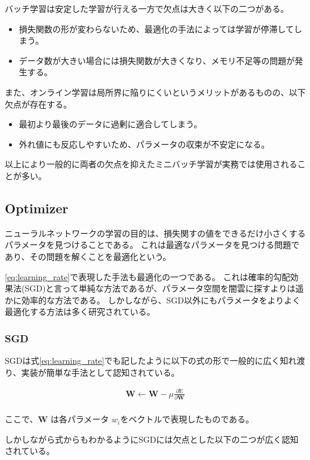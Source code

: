 バッチ学習は安定した学習が行える一方で欠点は大きく以下の二つがある。

\begin{itemize}
  \item 損失関数の形が変わらないため、最適化の手法によっては学習が停滞してしまう。
  \item データ数が大きい場合には損失関数が大きくなり、メモリ不足等の問題が発生する。
\end{itemize}

また、オンライン学習は局所界に陥りにくいというメリットがあるものの、以下欠点が存在する。

\begin{itemize}
  \item 最初より最後のデータに過剰に適合してしまう。
  \item 外れ値にも反応しやすいため、パラメータの収束が不安定になる。
\end{itemize}

以上により一般的に両者の欠点を抑えたミニバッチ学習が実務では使用されることが多い。

\subsection{Optimizer}
ニューラルネットワークの学習の目的は、損失関すの値をできるだけ小さくするパラメータを見つけることである。
これは最適なパラメータを見つける問題であり、その問題を解くことを最適化という。

\ref{eq:learning_rate}で表現した手法も最適化の一つである。
これは確率的勾配効果法(SGD)と言って単純な方法であるが、パラメータ空間を闇雲に探すよりは遥かに効率的な方法である。
しかしながら、SGD以外にもパラメータをよりよく最適化する方法は多く研究されている。

\subsubsection{SGD}
SGDは式\ref{eq:learning_rate}でも記したように以下の式の形で一般的に広く知れ渡り、実装が簡単な手法として認知されている。

\begin{eqnarray}
\mathbf{W} \leftarrow \mathbf{W} - \mu \frac{\partial \mathrm{E}}{\partial \mathbf{W}} \\
\label{eq:sgd}
\end{eqnarray}

ここで、$ \mathbf{W} $ は各パラメータ $ w_i $をベクトルで表現したものである。

しかしながら式からもわかるようにSGDには欠点とした以下の二つが広く認知されている。




